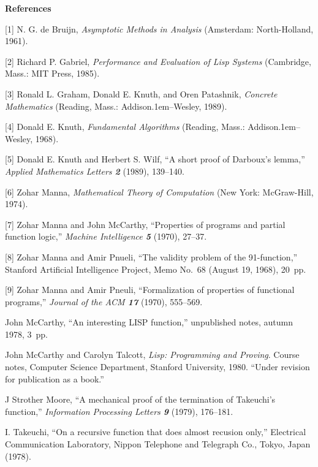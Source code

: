 \bigskip
\centerline{\bf References}

\parskip 3pt

\medskip

\bib
\phantom{1}[1]\enspace
N. G. de Bruijn, {\sl Asymptotic Methods in Analysis\/} 
(Amsterdam: North-Holland, 1961).

\bib
\phantom{1}[2]\enspace
Richard P. Gabriel, {\sl Performance and Evaluation of Lisp Systems\/}
(Cambridge, Mass.: MIT Press, 1985).

\bib
\phantom{1}[3]\enspace
Ronald L. Graham, Donald E. Knuth, and Oren Patashnik, {\sl Concrete
Mathematics\/} (Reading, Mass.: Addison\kern.1em--Wesley, 1989).

\bib
\phantom{1}[4]\enspace
Donald E. Knuth, {\sl Fundamental Algorithms\/} (Reading, Mass.:
Addison\kern.1em--Wesley, 1968).

\bib
\phantom{1}[5]\enspace
Donald E. Knuth and Herbert S. Wilf, ``A short proof of Darboux's
lemma,'' {\sl Applied Mathematics Letters\/ \bf 2} (1989), 139--140.

\bib
\phantom{1}[6]\enspace
Zohar Manna, {\sl Mathematical Theory of Computation\/} (New York:
McGraw-Hill, 1974).

\bib
\phantom{1}[7]\enspace
Zohar Manna and John McCarthy, ``Properties of programs and partial
function logic,'' {\sl Machine Intelligence\/ \bf 5} (1970), 27--37.

\bib
\phantom{1}[8]\enspace
Zohar Manna and Amir Pnueli, ``The validity problem of the
91-function,''
Stanford Artificial Intelligence Project, Memo No.~68 (August 19,
1968), 20~pp.

\bib
\phantom{1}[9]\enspace
Zohar Manna and Amir Pneuli, ``Formalization of properties of
functional programs,'' {\sl Journal of the ACM\/ \bf 17} (1970), 555--569.

\bib
[10]\enspace
John McCarthy, ``An interesting LISP function,'' unpublished
notes, autumn 1978, 3~pp.

\bib
[11]\enspace
John McCarthy and Carolyn Talcott, {\sl Lisp: Programming and Proving}.
Course notes, Computer Science Department, Stanford University, 1980.
``Under revision for publication as a book.''

\bib
[12]\enspace
J Strother Moore, ``A mechanical proof of the termination of
Takeuchi's function,'' {\sl Information Processing Letters\/ \bf 9}
(1979), 176--181.

\bib
[13]\enspace
I. Takeuchi, ``On a recursive function that does almost recusion
only,'' Electrical Communication Laboratory, Nippon Telephone and 
Telegraph Co., Tokyo, Japan (1978).

